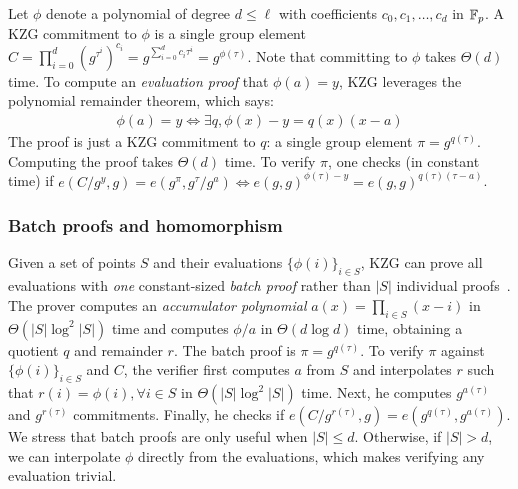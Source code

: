 Let $\phi$ denote a polynomial of degree $d\le \ell$ with coefficients $c_0, c_1, \dots, c_d$ in $\mathbb{F}_p$.
A KZG commitment to $\phi$ is a single group element $C = \prod_{i=0}^d {\left(g^{\tau^i}\right)^{c_i}} = g^{\sum_{i=0}^d c_i \tau^i} = g^{\phi(\tau)}$.
Note that committing to $\phi$ takes $\Theta(d)$ time.
To compute an \textit{evaluation proof} that $\phi(a) = y$, KZG leverages the polynomial remainder theorem, which says:
\begin{align}
    \phi(a) = y \Leftrightarrow \exists q, \phi(x) - y = q(x)(x-a)
    \label{eq:poly-rem-thm}
\end{align}
The proof is just a KZG commitment to $q$: a single group element $\pi=g^{q(\tau)}$.
Computing the proof takes $\Theta(d)$ time.
To verify $\pi$, one checks (in constant time) if 
$e(C / g^y, g) = e(g^{\pi}, g^{\tau}/g^a)\Leftrightarrow e(g,g)^{\phi(\tau)-y} = e(g,g)^{q(\tau)(\tau-a)}$.

\subsubsection{Batch proofs and homomorphism}
\label{s:prelim:polycommit:kzg:batch}
\label{s:prelim:polycommit:kzg:homomorphism}
Given a set of points $S$ and their evaluations $\{\phi(i)\}_{i\in S}$, KZG can prove all evaluations with \textit{one} constant-sized \textit{batch proof} rather than $|S|$ individual proofs~\cite{polycommit}.
The prover computes an \textit{accumulator polynomial} $a(x)=\prod_{i\in S} (x-i)$ in $\Theta(|S|\log^2{|S|})$ time and computes $\phi/a$ in $\Theta(d\log{d})$ time, obtaining a quotient $q$ and remainder $r$.
The batch proof is $\pi=g^{q(\tau)}$.
To verify $\pi$ against $\{\phi(i)\}_{i\in S}$ and $C$, the verifier first computes $a$ from $S$ and interpolates $r$ such that $r(i)=\phi(i), \forall i \in S$ in $\Theta(|S|\log^2{|S|})$ time.
Next, he computes $g^{a(\tau)}$ and $g^{r(\tau)}$ commitments.
Finally, he checks if $e(C / g^{r(\tau)}, g) = e(g^{q(\tau)}, g^{a(\tau)})$.
We stress that batch proofs are only useful when $|S| \le d$.
Otherwise, if $|S| > d$, we can interpolate $\phi$ directly from the evaluations, which makes verifying any evaluation trivial.

